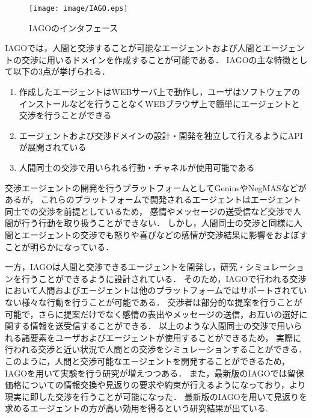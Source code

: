 \begin{figure}[htb]
    \centering
    \texttt{[image: image/IAGO.eps]}
    \caption{IAGOのインタフェース}
    \label{fig:iago}
\end{figure}

IAGOでは，人間と交渉することが可能なエージェントおよび人間とエージェントの交渉に用いるドメインを作成することが可能である．
IAGOの主な特徴として以下の3点が挙げられる\cite{pinocchio}．

\begin{enumerate}
    \item 作成したエージェントはWEBサーバ上で動作し，ユーザはソフトウェアのインストールなどを行うことなくWEBブラウザ上で簡単にエージェントと交渉を行うことができる
    \item エージェントおよび交渉ドメインの設計・開発を独立して行えるようにAPIが展開されている
    \item 人間同士の交渉で用いられる行動・チャネルが使用可能である
\end{enumerate}

交渉エージェントの開発を行うプラットフォームとしてGenius\cite{genius}やNegMAS\cite{negmas}などがあるが，
これらのプラットフォームで開発されるエージェントはエージェント同士での交渉を前提としているため，
感情やメッセージの送受信など交渉で人間が行う行動を取り扱うことができない．
しかし，人間同士の交渉と同様に人間とエージェントの交渉でも怒りや喜びなどの感情が交渉結果に影響をおよぼすことが明らかになっている\cite{emotion}．

一方，IAGOは人間と交渉できるエージェントを開発し，研究・シミュレーションを行うことができるように設計されている．
そのため，IAGOで行われる交渉において人間およびエージェントは他のプラットフォームではサポートされていない様々な行動を行うことが可能である．
交渉者は部分的な提案を行うことが可能で，さらに提案だけでなく感情の表出やメッセージの送信，お互いの選好に関する情報を送受信することができる．
以上のような人間同士の交渉で用いられる諸要素をユーザおよびエージェントが使用することができるため，
実際に行われる交渉と近い状況で人間との交渉をシミュレーションすることができる．
このように，人間と交渉可能なエージェントを開発することができるため，IAGOを用いて実験を行う研究が増えつつある．
また，最新版のIAGOでは留保価格についての情報交換や見返りの要求や約束が行えるようになっており，より現実に即した交渉を行うことが可能になった．
最新版のIAGOを用いて見返りを求めるエージェントの方が高い効用を得るという研究結果が出ている\cite{favor}.


